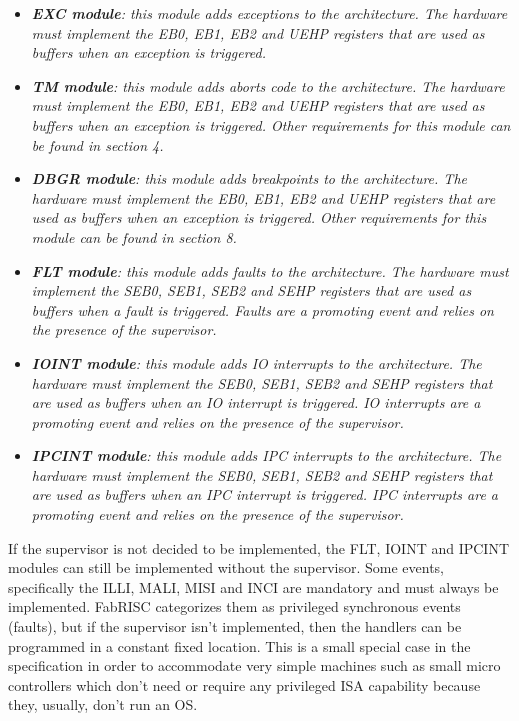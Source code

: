         \begin{itemize}

            \item \textit{\textbf{EXC module}: this module adds exceptions to the architecture. The hardware must implement the EB0, EB1, EB2 and UEHP registers that are used as buffers when an exception is triggered.}

            \item \textit{\textbf{TM module}: this module adds aborts code to the architecture. The hardware must implement the EB0, EB1, EB2 and UEHP registers that are used as buffers when an exception is triggered. Other requirements for this module can be found in section 4.}

            \item \textit{\textbf{DBGR module}: this module adds breakpoints to the architecture. The hardware must implement the EB0, EB1, EB2 and UEHP registers that are used as buffers when an exception is triggered. Other requirements for this module can be found in section 8.}

            \item \textit{\textbf{FLT module}: this module adds faults to the architecture. The hardware must implement the SEB0, SEB1, SEB2 and SEHP registers that are used as buffers when a fault is triggered. Faults are a promoting event and relies on the presence of the supervisor.}

            \item \textit{\textbf{IOINT module}: this module adds IO interrupts to the architecture. The hardware must implement the SEB0, SEB1, SEB2 and SEHP registers that are used as buffers when an IO interrupt is triggered. IO interrupts are a promoting event and relies on the presence of the supervisor.}

            \item \textit{\textbf{IPCINT module}: this module adds IPC interrupts to the architecture. The hardware must implement the SEB0, SEB1, SEB2 and SEHP registers that are used as buffers when an IPC interrupt is triggered. IPC interrupts are a promoting event and relies on the presence of the supervisor.}

        \end{itemize}

        If the supervisor is not decided to be implemented, the FLT, IOINT and IPCINT modules can still be implemented without the supervisor. Some events, specifically the ILLI, MALI, MISI and INCI are mandatory and must always be implemented. FabRISC categorizes them as privileged synchronous events (faults), but if the supervisor isn't implemented, then the handlers can be programmed in a constant fixed location. This is a small special case in the specification in order to accommodate very simple machines such as small micro controllers which don't need or require any privileged ISA capability because they, usually, don't run an OS.

